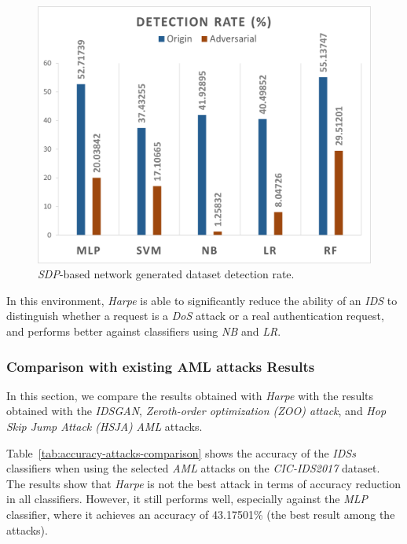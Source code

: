 \begin{figure}
    \centering
    \includegraphics[width=.95\columnwidth]{Figures/SDP-Dataset}
    \caption{\label{fig:dataset-sdp} \textit{SDP}-based network generated dataset detection rate.}
\end{figure}

In this environment, \textit{Harpe} is able to significantly reduce the ability of an \textit{IDS} to distinguish
whether a request is a \textit{DoS} attack or a real authentication request, and performs better against classifiers
using \textit{NB} and \textit{LR}.



\subsubsection{Comparison with existing AML attacks Results}

In this section, we compare the results obtained with \textit{Harpe} with the results obtained with the \textit{IDSGAN},
\textit{Zeroth-order optimization (ZOO) attack}, and \textit{Hop Skip Jump Attack (HSJA)} \textit{AML} attacks.

Table~\ref{tab:accuracy-attacks-comparison} shows the accuracy of the \textit{IDSs} classifiers when using the
selected \textit{AML} attacks on the \textit{CIC-IDS2017} dataset.
The results show that \textit{Harpe} is not the best attack in terms of accuracy reduction in all classifiers.
However, it still performs well, especially against the \textit{MLP} classifier, where it achieves an accuracy of
43.17501\% (the best result among the attacks).

